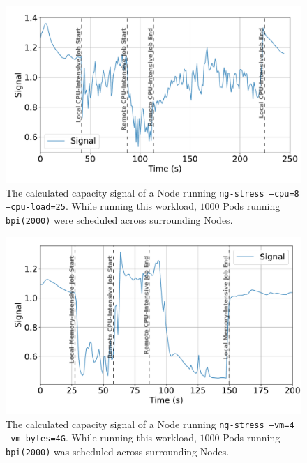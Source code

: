\begin{figure}[H]
    \centering
    \includegraphics[width=\textwidth]{images/signal-with-cpu.pdf}
    \caption{The calculated capacity signal of a Node running \texttt{ng-stress
    --cpu=8 --cpu-load=25}. While running this workload, $1000$ Pods running
    \texttt{bpi(2000)} were scheduled across surrounding Nodes.}
    \label{fig:signal-evaluation-cpu}
\end{figure}
\begin{figure}[H]
    \centering
    \includegraphics[width=\textwidth]{images/signal-with-memory.pdf}
    \caption{The calculated capacity signal of a Node running \texttt{ng-stress
    --vm=4 --vm-bytes=4G}. While running this workload, $1000$ Pods running
    \texttt{bpi(2000)} was scheduled across surrounding Nodes.}
    \label{fig:signal-evaluation-mem}
\end{figure}

